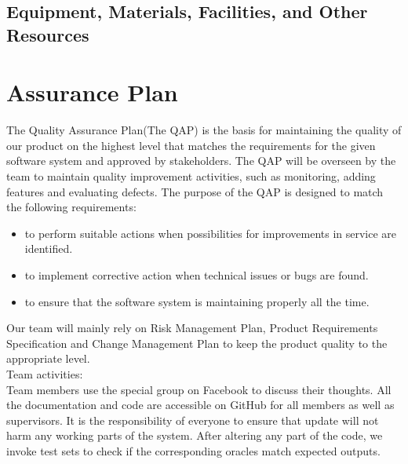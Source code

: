 \documentclass{l3deliverable}
\begin{document}
{%

\subsection{Equipment, Materials, Facilities, and Other Resources}


\section{Assurance Plan}


The Quality Assurance Plan(The QAP) is the basis for maintaining the quality of our product on the highest level that matches the requirements for the given software system and approved by stakeholders. The QAP will be overseen by the team to maintain quality improvement activities, such as monitoring, adding features and evaluating defects. The purpose of the QAP is designed to match the following requirements:\\

\begin{itemize}
\item to perform suitable actions when possibilities for improvements in service are identified.\\
\item to implement corrective action when technical issues or bugs are found.\\
\item to ensure that the software system is maintaining properly all the time.\\
\end{itemize}

Our team will mainly rely on Risk Management Plan, Product Requirements Specification and Change Management Plan to keep the product quality to the appropriate level.\\

Team activities:\\

Team members use the special group on Facebook to discuss their thoughts. All the documentation and code are  accessible on GitHub for all members as well as supervisors. It is the responsibility of everyone to ensure that update will not harm any working parts of the system. After altering any part of the code, we invoke test sets to check if the corresponding oracles match expected outputs.\\ 

}
\end{document}
